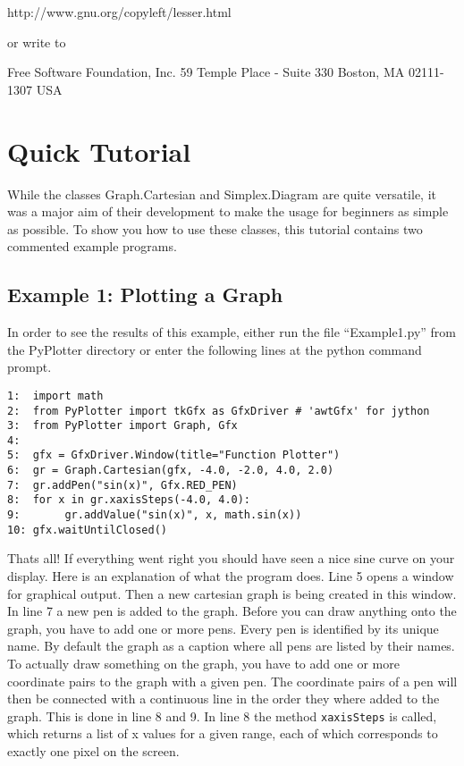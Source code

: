 \documentclass[12pt,a4paper,USenglish]{article}
\begin{document}
  http://www.gnu.org/copyleft/lesser.html 
  
or write to 

  Free Software Foundation, Inc.
  59 Temple Place - Suite 330
  Boston, MA 02111-1307 USA

\section{Quick Tutorial}

While the classes Graph.Cartesian and Simplex.Diagram are quite
versatile, it was a major aim of their development to make the usage
for beginners as simple as possible. To show you how to use these
classes, this tutorial contains two commented example programs.

\subsection{Example 1: Plotting a Graph}

In order to see the results of this example, either run the file
``Example1.py'' from the {\sf PyPlotter} directory or enter the following
lines at the python command prompt.

\begin{verbatim}
1:  import math
2:  from PyPlotter import tkGfx as GfxDriver # 'awtGfx' for jython
3:  from PyPlotter import Graph, Gfx
4:    
5:  gfx = GfxDriver.Window(title="Function Plotter")   
6:  gr = Graph.Cartesian(gfx, -4.0, -2.0, 4.0, 2.0)    
7:  gr.addPen("sin(x)", Gfx.RED_PEN)
8:  for x in gr.xaxisSteps(-4.0, 4.0):
9:       gr.addValue("sin(x)", x, math.sin(x))
10: gfx.waitUntilClosed()
\end{verbatim}

Thats all! If everything went right you should have seen a nice sine
curve on your display. Here is an explanation of what the program
does. Line 5 opens a window for graphical output. Then a new cartesian
graph is being created in this window. In line 7 a new pen is added to
the graph. Before you can draw anything onto the graph, you have to
add one or more pens. Every pen is identified by its unique name. By
default the graph as a caption where all pens are listed by their
names. To actually draw something on the graph, you have to add one or
more coordinate pairs to the graph with a given pen. The coordinate
pairs of a pen will then be connected with a continuous line in the
order they where added to the graph. This is done in line 8 and 9.  In
line 8 the method {\tt xaxisSteps} is called, which returns a list of
x values for a given range, each of which corresponds to exactly one
pixel on the screen.
\end{document}
